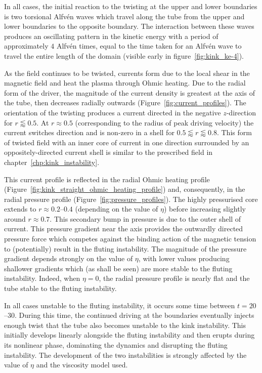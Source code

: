 In all cases, the initial reaction to the twisting at the upper and lower boundaries is two torsional Alfv\'en waves which travel along the tube from the upper and lower boundaries to the opposite boundary. The interaction between these waves produces an oscillating pattern in the kinetic energy with a period of approximately $4$ Alfv\'en times, equal to the time taken for an Alfv\'en wave to travel the entire length of the domain (visible early in figure~\ref{fig:kink_ke-4}).

As the field continues to be twisted, currents form due to the local shear in the magnetic field and heat the plasma through Ohmic heating. Due to the radial form of the driver, the magnitude of the current density is greatest at the axis of the tube, then decreases radially outwards (Figure~\ref{fig:current_profiles}). The orientation of the twisting produces a current directed in the negative $z$-direction for $r\lessapprox0.5$. At $r \approx 0.5$ (corresponding to the radius of peak driving velocity) the current switches direction and is non-zero in a shell for $0.5\lessapprox r \lessapprox 0.8$. This form of twisted field with an inner core of current in one direction surrounded by an oppositely-directed current shell is similar to the prescribed field in chapter~\ref{chp:kink_instability}.

This current profile is reflected in the radial Ohmic heating profile (Figure~\ref{fig:kink_straight_ohmic_heating_profile}) and, consequently, in the radial pressure profile (Figure~\ref{fig:pressure_profiles}). The highly pressurised core extends to $r\approx 0.2$--$0.4$ (depending on the value of $\eta$) before increasing slightly around $r\approx 0.7$. This secondary bump in pressure is due to the outer shell of current. This pressure gradient near the axis provides the outwardly directed pressure force which competes against the binding action of the magnetic tension to (potentially) result in the fluting instability.  The magnitude of the pressure gradient depends strongly on the value of $\eta$, with lower values producing shallower gradients which (as shall be seen) are more stable to the fluting instability. Indeed, when $\eta=0$, the radial pressure profile is nearly flat and the tube stable to the fluting instability.

In all cases unstable to the fluting instability, it occurs some time between $t=20$--$30$. During this time, the continued driving at the boundaries eventually injects enough twist that the tube also becomes unstable to the kink instability. This initially develops linearly alongside the fluting instability and then erupts during its nonlinear phase, dominating the dynamics and disrupting the fluting instability. The development of the two instabilities is strongly affected by the value of $\eta$ and the viscosity model used.

